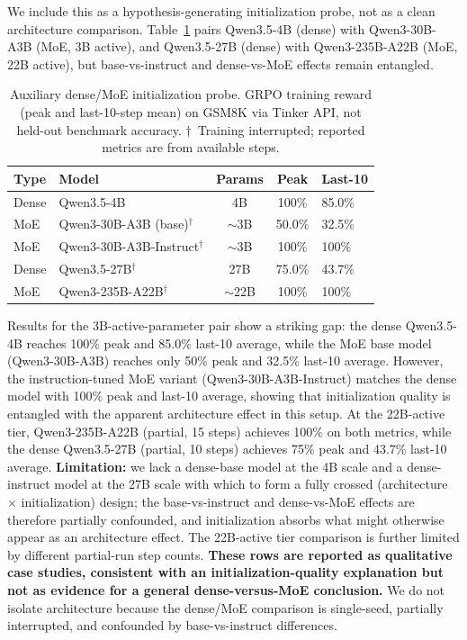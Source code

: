 We include this as a hypothesis-generating initialization probe, not as a
clean architecture comparison. Table~\ref{tab:dense_moe} pairs Qwen3.5-4B
(dense) with Qwen3-30B-A3B (MoE, 3B active), and Qwen3.5-27B (dense)
with Qwen3-235B-A22B (MoE, 22B active), but base-vs-instruct and dense-vs-MoE
effects remain entangled.

\begin{table}[htbp]
\centering
\caption{Auxiliary dense/MoE initialization probe. GRPO training reward (peak and last-10-step mean) on GSM8K via Tinker API, not held-out benchmark accuracy. $\dagger$~Training interrupted; reported metrics are from available steps.}
\label{tab:dense_moe}
\begin{tabular}{llccp{3.5cm}}
\toprule
\textbf{Type} & \textbf{Model} & \textbf{Params} & \textbf{Peak} & \textbf{Last-10} \\
\midrule
Dense & Qwen3.5-4B & 4B & 100\% & 85.0\% \\
MoE & Qwen3-30B-A3B (base)$^\dagger$ & $\sim$3B & 50.0\% & 32.5\% \\
MoE & Qwen3-30B-A3B-Instruct$^\dagger$ & $\sim$3B & 100\% & 100\% \\
\midrule
Dense & Qwen3.5-27B$^\dagger$ & 27B & 75.0\% & 43.7\% \\
MoE & Qwen3-235B-A22B$^\dagger$ & $\sim$22B & 100\% & 100\% \\
\bottomrule
\end{tabular}
\end{table}

Results for the 3B-active-parameter pair show a striking gap: the dense
Qwen3.5-4B reaches 100\% peak and 85.0\% last-10 average, while the
MoE base model (Qwen3-30B-A3B) reaches only 50\% peak and 32.5\% last-10
average. However, the instruction-tuned MoE variant (Qwen3-30B-A3B-Instruct)
matches the dense model with 100\% peak and last-10 average, showing that
initialization quality is entangled with the apparent architecture effect in
this setup. At the 22B-active tier, Qwen3-235B-A22B
(partial, 15 steps) achieves 100\% on both metrics, while the dense
Qwen3.5-27B (partial, 10 steps) achieves 75\% peak and 43.7\% last-10
average.  \textbf{Limitation:} we lack a dense-base model at the 4B scale
and a dense-instruct model at the 27B scale with which to form a fully
crossed (architecture $\times$ initialization) design; the base-vs-instruct
and dense-vs-MoE effects are therefore partially confounded, and initialization absorbs
what might otherwise appear as an architecture effect.  The 22B-active tier
comparison is further limited by different partial-run step counts.
\textbf{These rows are reported as qualitative case studies, consistent with an
initialization-quality explanation but not as evidence for a general
dense-versus-MoE conclusion.}  We do not isolate architecture because the
dense/MoE comparison is single-seed, partially interrupted, and confounded
by base-vs-instruct differences.

